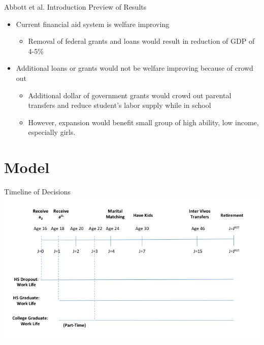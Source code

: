 \documentclass{beamer}
\begin{document}
\begin{frame}{Abbott et al. Introduction}
Preview of Results
\begin{itemize}
\item Current financial aid system is welfare improving
	\begin{itemize} 
	\item Removal of federal grants and loans would result in reduction of GDP of 4-5\% 
	\end{itemize}
\item Additional loans or grants would not be welfare improving because of crowd out 
	\begin{itemize} 
    \item Additional dollar of government grants would crowd out parental transfers and reduce student's labor supply while in school
	\item However, expansion would benefit small group of high ability, low income, especially girls.
	\end{itemize}
\end{itemize}
\end{frame}


\section{Model}

\begin{frame}{Timeline of Decisions}
\includegraphics[width=\textwidth]{Timeline.png}
\end{frame}
\end{document}
